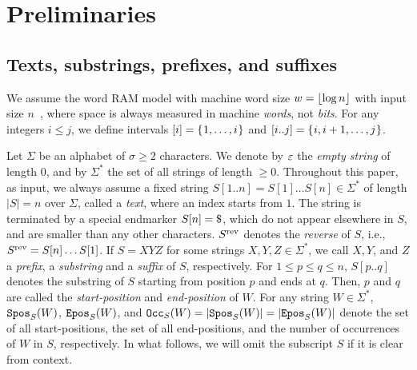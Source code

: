 \section{Preliminaries}
\label{sec:prelim}

\subsection{Texts, substrings, prefixes, and suffixes}
We assume the word RAM model with machine word size $w = \floor{\log n}$ with input size $n$~\cite{navarro2016cds:book}, where space is always measured in machine \textit{words}, not \textit{bits}. 
For any integers $i\le j$, we define intervals $[i]=\set{1,\dots,i}$ and $[i..j] = \set{i, i+1, \dots, j}$.

Let $\Sigma$ be an alphabet of $\sigma\ge 2$ characters. We denote by $\eps$ the \textit{empty string} of length $0$, and by $\Sigma^*$ the set of all strings of length $\ge 0$. 
Throughout this paper, as input, we always assume a fixed string $S[1..n] = S[1]\dots S[n] \in \Sigma^*$ of length $|S| = n$ over $\Sigma$, called a \textit{text}, where an index starts from $1$. The string is terminated by a special endmarker $S[n]=\daller$, which do not appear elsewhere in $S$, and are smaller than any other characters. $S\rev$ denotes the \textit{reverse} of $S$, i.e., $S\rev = S[n]\dots S[1]$. 
If $S = XYZ$ for some strings $X, Y, Z \in \Sigma^*$, we call $X, Y$, and $Z$ a \textit{prefix}, a \textit{substring} and a \textit{suffix} of $S$, respectively.
For $1\le p \le q\le n$, $S[p..q]$ denotes the substring of $S$ starting from position $p$ and ends at $q$. Then, $p$ and $q$ are called the \textit{start-position} and \textit{end-position} of $W$.
For any string $W \in \Sigma^*$, $\spos[S](W)$, $\epos[S](W)$, and $\occ[S](W) = |\spos[S](W)| = |\epos[S](W)|$  denote the set of all start-positions, the set of all end-positions, and the number of occurrences of $W$ in $S$, respectively.
In what follows, we will omit the subscript $S$ if it is clear from context.


